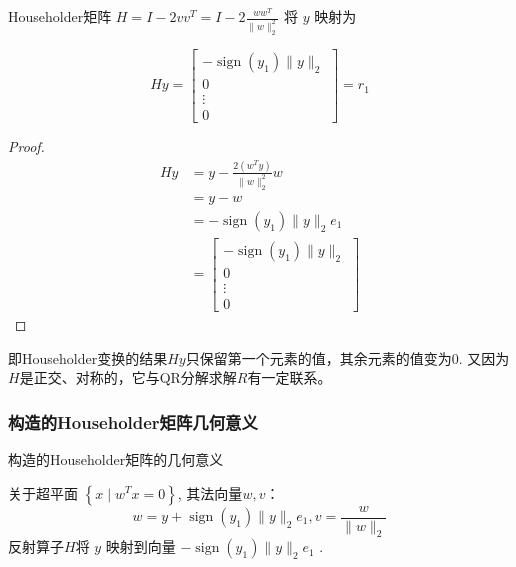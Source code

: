 \begin{theorem}
    Householder矩阵 $ H=I-2 v v^{T}=I-2 \frac{w w^{T}}{\|w\|_{2}^{2}} $ 将 $ y $ 映射为

   \begin{equation} H y = \left[\begin{array}{c}-\operatorname{sign}\left(y_{1}\right)\|y\|_{2} \\ 0 \\ \vdots \\ 0\end{array}\right] = r_1 \end{equation}
\end{theorem}


\begin{proof}
    \begin{equation} 
\begin{aligned}
    H y&=y-\frac{2\left(w^{T} y\right)}{\|w\|_{2}^{2}} w\\
    &=y-w\\
    &=-\operatorname{sign}\left(y_{1}\right)\|y\|_{2} e_{1}\\
    &=\left[\begin{array}{c}-\operatorname{sign}\left(y_{1}\right)\|y\|_{2} \\ 0 \\ \vdots \\ 0\end{array}\right]
\end{aligned}
 \end{equation}
\end{proof}

即Householder变换的结果$Hy$只保留第一个元素的值，其余元素的值变为0. 又因为$H$是正交、对称的，它与QR分解求解$R$有一定联系。

\subsubsection{构造的Householder矩阵几何意义}


\begin{FigureCenter}{构造的Householder矩阵的几何意义}
   
\end{FigureCenter}


关于超平面 $ \left\{x \mid w^{T} x=0\right\} $, 其法向量$w,v$：
\begin{equation}
w=y+\operatorname{sign}\left(y_{1}\right)\|y\|_{2} e_{1},v=\frac{w}{\|w\|_{2}}
\end{equation}
反射算子$H$将 $ y $ 映射到向量 $ -\operatorname{sign}\left(y_{1}\right)\|y\|_{2} e_{1} $ .

